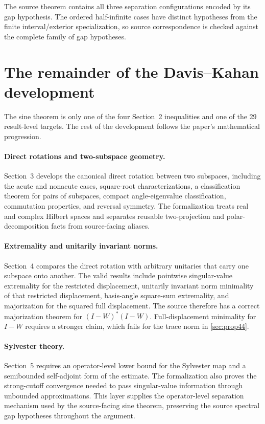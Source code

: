 \documentclass[11pt]{article}
\newcommand{\DKResultCount}{29}
\begin{document}
The source theorem contains all three separation configurations encoded by its
gap hypothesis.  The ordered half-infinite cases have distinct hypotheses from
the finite interval/exterior specialization, so source correspondence is checked
against the complete family of gap hypotheses.

\section{The remainder of the Davis--Kahan development}
\label{sec:dk-rest}

The sine theorem is only one of the four Section~2 inequalities and one of the
\DKResultCount{} result-level targets.  The rest of the development follows the
paper's mathematical progression.

\paragraph{Direct rotations and two-subspace geometry.}
Section~3 develops the canonical direct rotation between two subspaces,
including the acute and nonacute cases, square-root characterizations, a
classification theorem for pairs of subspaces, compact angle-eigenvalue
classification, commutation properties, and reversal symmetry.  The
formalization treats real and complex Hilbert spaces and separates reusable
two-projection and polar-decomposition facts from source-facing aliases.

\paragraph{Extremality and unitarily invariant norms.}
Section~4 compares the direct rotation with arbitrary unitaries that carry one
subspace onto another.  The valid results include pointwise singular-value
extremality for the restricted displacement, unitarily invariant norm
minimality of that restricted displacement, basis-angle square-sum
extremality, and majorization for the squared full displacement.  The source therefore has a correct majorization theorem for
$(I-W)^*(I-W)$.  Full-displacement minimality for $I-W$ requires a stronger
claim, which fails for the trace norm in \cref{sec:prop44}.

\paragraph{Sylvester theory.}
Section~5 requires an operator-level lower bound for the Sylvester map and a
semibounded self-adjoint form of the estimate.  The formalization also proves
the strong-cutoff convergence needed to pass singular-value information through
unbounded approximations.  This layer supplies the operator-level separation
mechanism used by the source-facing sine theorem, preserving the source spectral
gap hypotheses throughout the argument.
\end{document}
